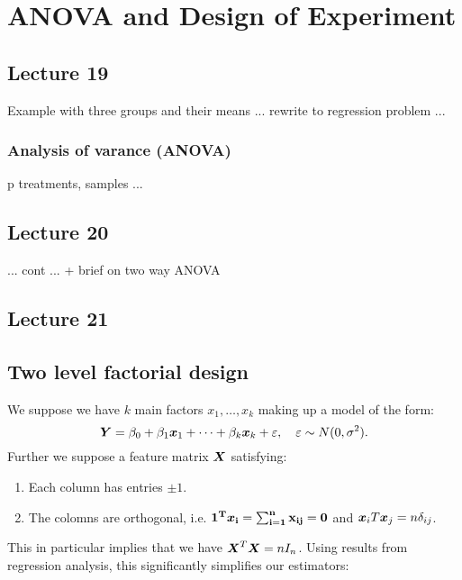 \section{ANOVA and Design of Experiment}
\subsection*{Lecture 19}

Example with three groups and their means ... rewrite to regression problem ...


 

\subsubsection*{Analysis of varance (ANOVA)}
p treatments, samples ...

 


\subsection*{Lecture  20}


... cont ... + brief on two way ANOVA

\subsection*{Lecture  21}
\subsection{Two level factorial design}

We suppose we have $k$ main factors $x_1,\dots,x_k$ making up a model of the form:
$$
    \boldsymbol{Y}=\beta_0 + \beta_1\boldsymbol{x}_1+\dots+\beta_k\boldsymbol{x}_k + \varepsilon, \quad \varepsilon\sim N(0, \sigma^2).
$$ 
Further we suppose a feature matrix $\boldsymbol{X}$ satisfying:
\begin{enumerate}
    \item Each column has entries $\pm 1$.
    \item The colomns are orthogonal, i.e. $\bf{1}^T\boldsymbol{x}_i=\sum_{i=1}^n x_{ij}=0$ and $\boldsymbol{x}_iT\boldsymbol{x}_j=n\delta_{ij}$. 
\end{enumerate}

This in particular implies that we have $\boldsymbol{X}^T \boldsymbol{X} = n I_n$. Using results from regression analysis, this significantly simplifies our estimators:


